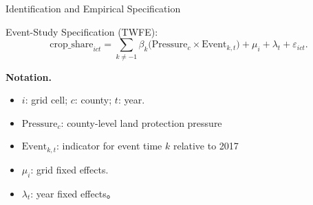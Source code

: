 \documentclass[10pt, xcolor=x11names,compress, aspectratio=169]{beamer}
\begin{document}
\begin{frame}{Identification and Empirical Specification}

\begin{block}{Event-Study Specification (TWFE):}
\[
    \text{crop\_share}_{i c t}
    =
    \sum_{k \neq -1}
    \beta_k
    \Big(
        \text{Pressure}_{c} 
        \times 
        \text{Event}_{k,t}
    \Big)
    +
    \mu_i
    +
    \lambda_t
    +
    \varepsilon_{i c t}.
\]
\end{block}

\bigskip

\textbf{Notation.}
\begin{itemize}\setlength{\itemsep}{6pt}
    \item $i$: grid cell;  $c$: county; $t$: year.
    \item $\text{Pressure}_{c}$: county-level land protection pressure
    \item $\text{Event}_{k,t}$: indicator for event time $k$ relative to 2017  
    \item $\mu_i$: grid fixed effects.
    \item $\lambda_t$: year fixed effects。
\end{itemize}



\end{frame}
\end{document}
